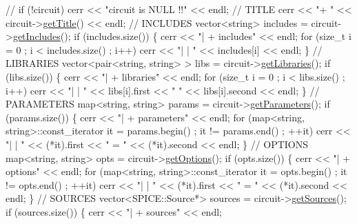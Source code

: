 \begin{DoxyCodeInclude}
\textcolor{comment}{//    if (!circuit) cerr << "circuit is NULL !!" << endl;}
    \textcolor{comment}{// TITLE}
    cerr << \textcolor{stringliteral}{"+ "} << circuit->\hyperlink{class_s_p_i_c_e_1_1_circuit_ad19721dd878c04c854a72af12d785741}{getTitle}() << endl;
    \textcolor{comment}{// INCLUDES}
    vector<string> includes = circuit->\hyperlink{class_s_p_i_c_e_1_1_circuit_a312beaf640e84589e6644820355c8ed6}{getIncludes}();
    \textcolor{keywordflow}{if} (includes.size()) \{
        cerr << \textcolor{stringliteral}{"| + includes"} << endl;
        \textcolor{keywordflow}{for} (\textcolor{keywordtype}{size\_t} i = 0 ; i < includes.size() ; i++)
            cerr << \textcolor{stringliteral}{"| | "} << includes[i] << endl;
    \}
    \textcolor{comment}{// LIBRARIES}
    vector<pair<string, string> > libs = circuit->\hyperlink{class_s_p_i_c_e_1_1_circuit_a3e6a71a711e4796470f1a2a1dc42aef6}{getLibraries}();
    \textcolor{keywordflow}{if} (libs.size()) \{
        cerr << \textcolor{stringliteral}{"| + libraries"} << endl;
        \textcolor{keywordflow}{for} (\textcolor{keywordtype}{size\_t} i = 0 ; i < libs.size() ; i++)
            cerr << \textcolor{stringliteral}{"| | "} << libs[i].first << \textcolor{stringliteral}{" "} << libs[i].second << endl;
    \}
    \textcolor{comment}{// PARAMETERS}
    map<string, string> params = circuit->\hyperlink{class_s_p_i_c_e_1_1_circuit_a4c46676f9ead2db537a0dd963b4f08f1}{getParameters}();
    \textcolor{keywordflow}{if} (params.size()) \{
        cerr << \textcolor{stringliteral}{"| + parameters"} << endl;
        \textcolor{keywordflow}{for} (map<string, string>::const\_iterator it = params.begin() ; it != params.end() ; ++it)
            cerr << \textcolor{stringliteral}{"| | "} << (*it).first << \textcolor{stringliteral}{" = "} << (*it).second << endl;
    \}
    \textcolor{comment}{// OPTIONS}
    map<string, string> opts = circuit->\hyperlink{class_s_p_i_c_e_1_1_circuit_a4ee11ef79ef893c5621e0e7d26a7f9a7}{getOptions}();
    \textcolor{keywordflow}{if} (opts.size()) \{
        cerr << \textcolor{stringliteral}{"| + options"} << endl;
        \textcolor{keywordflow}{for} (map<string, string>::const\_iterator it = opts.begin() ; it != opts.end() ; ++it)
            cerr << \textcolor{stringliteral}{"| | "} << (*it).first << \textcolor{stringliteral}{" = "} << (*it).second << endl;
    \}
    \textcolor{comment}{// SOURCES}
    vector<SPICE::Source*> sources = circuit->\hyperlink{class_s_p_i_c_e_1_1_circuit_ac18caa525ed386c44874ee643c88e27b}{getSources}();
    \textcolor{keywordflow}{if} (sources.size()) \{
        cerr << \textcolor{stringliteral}{"| + sources"} << endl;

\end{DoxyCodeInclude}
